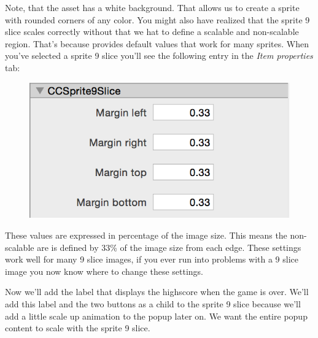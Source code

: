 Note, that the asset  has a white background.
That allows us to create a sprite with rounded corners of any color. You might
also have realized that the sprite 9 slice scales correctly without that we hat
to define a scalable and non-scalable region. That's because \SB{} provides
default values that work for many sprites. When you've selected a sprite 9 slice
you'll see the following entry in the \textit{Item properties} tab:
\begin{figure}[H]
    \centering
    \includegraphics[width=0.5\linewidth]{images/Chapter7/9_slice_settings.png}
\end{figure}
These values are expressed in percentage of the image size. This means the
non-scalable are is defined by 33\% of the image size from each edge. These
settings work well for many 9 slice images, if you ever run into problems with a
9 slice image you now know where to change these settings.

Now we'll add the label that displays the highscore when the game is over. We'll
add this label and the two buttons as a child to the sprite 9 slice because
we'll add a little scale up animation to the popup later on. We want the entire
popup content to scale with the sprite 9 slice.

